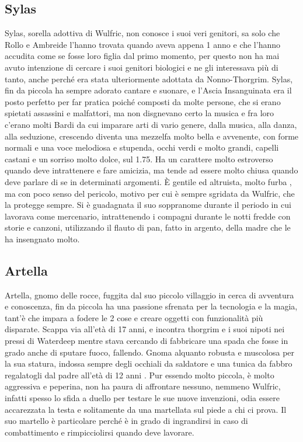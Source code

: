 \documentclass{article}
\begin{document}
\subsection{Sylas}Sylas, sorella adottiva di Wulfric, non conosce i suoi veri genitori, sa solo che Rollo e Ambreide l'hanno trovata quando aveva appena 1 anno e che l'hanno accudita come se fosse loro figlia dal primo momento, per questo non ha mai avuto intenzione di cercare i suoi genitori biologici e ne gli interessava più di tanto, anche perché era stata ulteriormente adottata da Nonno-Thorgrim. Sylas, fin da piccola ha sempre adorato cantare e suonare, e l'Ascia Insanguinata era il posto perfetto per far pratica poiché composti da molte persone, che si erano spietati assassini e malfattori, ma non disgnevano certo la musica e fra loro c'erano molti Bardi da cui imparare arti di vario genere, dalla musica, alla danza, alla seduzione, crescendo diventa una mezzelfa molto bella e avvenente, con forme normali e una voce melodiosa e stupenda, occhi verdi e molto grandi, capelli castani e un sorriso molto dolce, sul 1.75. Ha un carattere molto estroverso quando deve intrattenere e fare amicizia, ma tende ad essere molto chiusa quando deve parlare di se in determinati argomenti. È gentile ed altruista, molto furba , ma con poco senso del pericolo, motivo per cui è sempre sgridata da Wulfric, che la protegge sempre. Si è guadagnata il suo soppranome durante il periodo in cui lavorava come mercenario, intrattenendo i compagni durante le notti fredde con storie e canzoni, utilizzando il flauto di pan, fatto in argento, della madre che le ha insengnato molto. 
\subsection{Artella}
Artella, gnomo delle rocce, fuggita dal suo piccolo villaggio in cerca di avventura e conoscenza, fin da piccola ha una passione sfrenata per la tecnologia e la magia, tant'è che impara a fodere le 2 cose e creare oggetti con funzionalità più disparate. Scappa via all'età di 17 anni, e incontra thorgrim e i suoi nipoti nei pressi di Waterdeep mentre stava cercando di fabbricare una spada che fosse in grado anche di sputare fuoco, fallendo. Gnoma alquanto robusta e muscolosa per la sua statura, indossa sempre degli occhiali da saldatore e una tunica da fabbro regalatogli dal padre  all'età di 12 anni . Pur essendo molto piccola, è molto aggressiva e peperina, non ha paura di affrontare nessuno, nemmeno Wulfric, infatti spesso lo sfida a duello per testare le sue nuove invenzioni, odia essere accarezzata la testa e solitamente da una martellata sul piede a chi ci prova. Il suo martello è particolare perché è in grado di ingrandirsi in caso di combattimento e rimpicciolirsi quando deve lavorare. 
\end{document}
